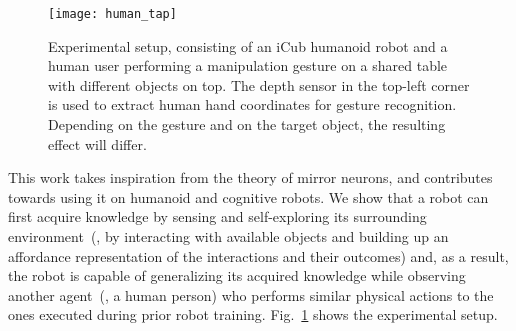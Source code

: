 \begin{figure}
  \centering
  \texttt{[image: human\_tap]}
  \caption{Experimental setup, consisting of an iCub humanoid robot and a human user performing a manipulation gesture on a shared table with different objects on top. The depth sensor in the top-left corner is used to extract human hand coordinates for gesture recognition. Depending on the gesture and on the target object, the resulting effect will differ.}
  \label{fig:experimental_setup}
\end{figure}

This work takes inspiration from the theory of mirror neurons, and contributes towards using it on humanoid and cognitive robots. We show that a robot can first acquire knowledge by sensing and self-exploring its surrounding environment~(\eg, by interacting with available objects and building up an affordance representation of the interactions and their outcomes) and, as a result, the robot is capable of generalizing its acquired knowledge while observing another agent~(\eg, a human person) who performs similar physical actions to the ones executed during prior robot training. Fig.~\ref{fig:experimental_setup} shows the experimental setup.
